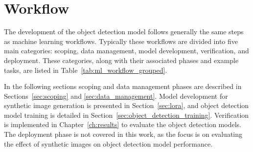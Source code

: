 \section{Workflow}
\label{sec:workflow}
The development of the object detection model follows generally the same steps as machine learning workflows. Typically these workflows are divided into five main categories: scoping, data management, model development, verification, and deployment. These categories, along with their associated phases and example tasks, are listed in Table~\ref{tab:ml_workflow_grouped}.

In the following sections scoping and data management phases are described in Sections~\ref{sec:scoping} and \ref{sec:data_management}. Model development for synthetic image generation is presented in Section~\ref{sec:lora}, and object detection model training is detailed in Section~\ref{sec:object_detection_training}. Verification is implemented in Chapter~\ref{ch:results} to evaluate the object detection models. The deployment phase is not covered in this work, as the focus is on evaluating the effect of synthetic images on object detection model performance.


